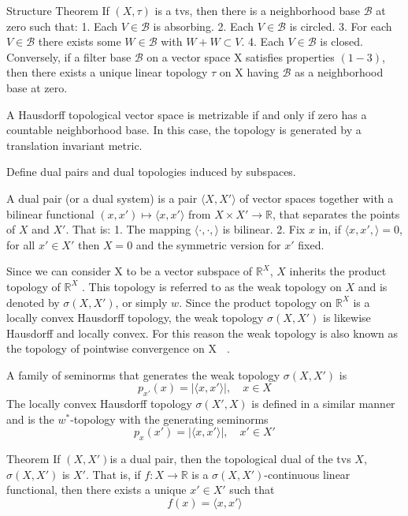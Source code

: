 Structure Theorem If \( (X, \tau) \) is a tvs, then there is a neighborhood base \( \mathcal{B} \) at zero such that:
1. Each \( V \in \mathcal{B} \) is absorbing.
2. Each \( V \in \mathcal{B} \) is circled.
3. For each \( V \in \mathcal{B} \) there exists some \( W \in \mathcal{B} \) with \( W + W \subset V \).
4. Each \( V \in \mathcal{B} \) is closed.
Conversely, if a filter base \( \mathcal{B} \) on a vector space X satisﬁes properties \( (1-3) \), 
then there exists a unique linear topology \( \tau \) on X having \( \mathcal{B} \) as a neighborhood base at zero.

A Hausdorff topological vector space is metrizable if and only
if zero has a countable neighborhood base. In this case, the topology is generated
by a translation invariant metric.



Define dual pairs and dual topologies induced by subspaces.

A dual pair (or a dual system) is a pair \( \langle X, X' \rangle \) of vector
spaces together with a bilinear functional  \( (x, x') \mapsto \langle x, x' \rangle \) from \( X \times X' \to \mathbb{R} \), that
separates the points of \( X \) and \( X' \). That is:
1. The mapping \( \langle \cdot, \cdot, \rangle \) is bilinear.
2. Fix \( x \) in, if \( \langle x, x', \rangle = 0 \), for all \( x' \in X' \) then \( X = 0 \) and the symmetric version for \( x' \) fixed.

Since we can consider X to be a vector subspace of \( \mathbb{R}^X \), \( X \) inherits the product
topology of \( \mathbb{R}^X \) . This topology is referred to as the weak topology on \( X \) and is
denoted by \( \sigma(X, X') \), or simply \( w \). Since the product topology on \( \mathbb{R}^X \) is a locally
convex Hausdorﬀ topology, the weak topology \( \sigma(X, X') \) is likewise Hausdorﬀ and locally convex.
For this reason the weak topology is also known as the topology of pointwise convergence on X  . 

A family of seminorms that generates the weak
topology \( \sigma(X, X') \) is 
\[
  p_{x'}(x) = | \langle x, x' \rangle|, \quad x \in X
\]
The locally convex Hausdorff topology \( \sigma(X', X) \) is deﬁned in a similar manner
and is the \( w^\ast \)-topology with the generating seminorms
\[
  p_{x}(x') = | \langle x, x' \rangle|, \quad x' \in X'
\]

Theorem 
If \( (X, X') \)is a dual pair, then the topological dual of the tvs \( X \), \( \sigma(X, X') \) is \( X' \). 
That is, if \( f : X \to \mathbb{R} \) is a \( \sigma(X, X') \)-continuous linear functional, then there exists a unique \( x' \in X' \) such that
\[
    f(x) = \langle x, x' \rangle
\]
